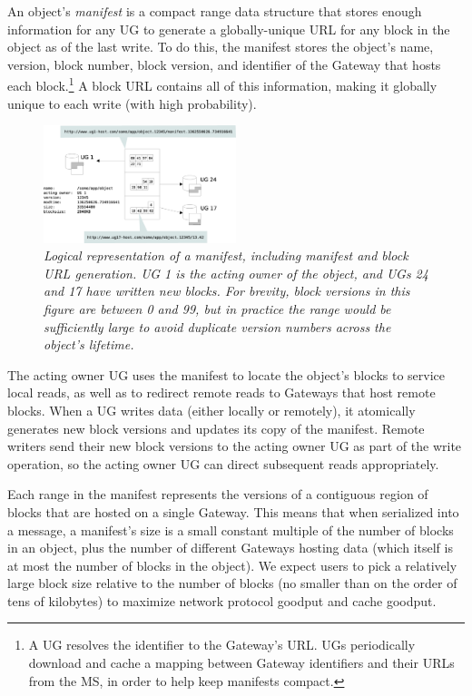 An object's \textit{manifest} is a compact range data structure that stores enough information for any UG to generate a globally-unique URL for any block in the object as of the last write. To do this, the manifest stores the object's name, version, block number, block version, and identifier of the Gateway that hosts each block.\footnote{A UG resolves the identifier to the Gateway's URL. UGs periodically download and cache a mapping between Gateway identifiers and their URLs from the MS, in order to help keep manifests compact.} A block URL contains all of this information, making it globally unique to each write (with high probability).

\begin{figure}[h!]
\centering
\includegraphics[width=0.5\textwidth]{figures/manifest}
\caption{\it Logical representation of a manifest, including manifest and block URL generation.  UG 1 is the acting owner of the object, and UGs 24 and 17 have written new blocks.  For brevity, block versions in this figure are between 0 and 99, but in practice the range would be sufficiently large to avoid duplicate version numbers across the object's lifetime.}
\label{fig:architecture}
\end{figure}

The acting owner UG uses the manifest to locate the object's blocks to service local reads, as well as to redirect remote reads to Gateways that host remote blocks. When a UG writes data (either locally or remotely), it atomically generates new block versions and updates its copy of the manifest. Remote writers send their new block versions to the acting owner UG as part of the write operation, so the acting owner UG can direct subsequent reads appropriately.

Each range in the manifest represents the versions of a contiguous region of blocks that are hosted on a single Gateway. This means that when serialized into a message, a manifest's size is a small constant multiple of the number of blocks in an object, plus the number of different Gateways hosting data (which itself is at most the number of blocks in the object). We expect users to pick a relatively large block size relative to the number of blocks (no smaller than on the order of tens of kilobytes) to maximize network protocol goodput and cache goodput.

